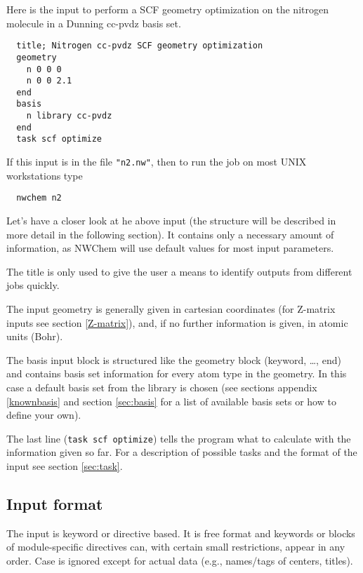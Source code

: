   Here is the input to perform a SCF geometry optimization on the nitrogen
molecule in a Dunning cc-pvdz basis set.
\begin{verbatim}
  title; Nitrogen cc-pvdz SCF geometry optimization
  geometry 
    n 0 0 0
    n 0 0 2.1
  end
  basis
    n library cc-pvdz
  end
  task scf optimize
\end{verbatim}

If this input is in the file \verb+"n2.nw"+, then to run the job on
most UNIX workstations type
\begin{verbatim}
  nwchem n2
\end{verbatim}

Let's have a closer look at he above input (the structure will be
described in more detail in the following section). It contains only a
necessary amount of information, as NWChem will use default values
for most input parameters.

The title is only used to give the user a means to identify
outputs from different jobs quickly.

The input geometry is generally given in cartesian coordinates (for
Z-matrix inputs see section \ref{Z-matrix}), and, if no further
information is given, in atomic units (Bohr). 

The basis input block is structured like the geometry block (keyword,
\ldots, end) and contains basis set information for every atom type in
the geometry. In this case a default basis set from the library is
chosen (see sections appendix \ref{knownbasis} and section
\ref{sec:basis} for a list of available basis sets or how to define
your own).

The last line ({\tt task scf optimize})
tells the program what to calculate with the information given so
far. For a description of possible tasks and the format of the input
see section \ref{sec:task}.

\subsection{Input format}

The input is keyword or directive based.  It is free format and
keywords or blocks of module-specific directives can, with certain
small restrictions, appear in any order.  Case is ignored except
for actual data (e.g., names/tags of centers, titles).

